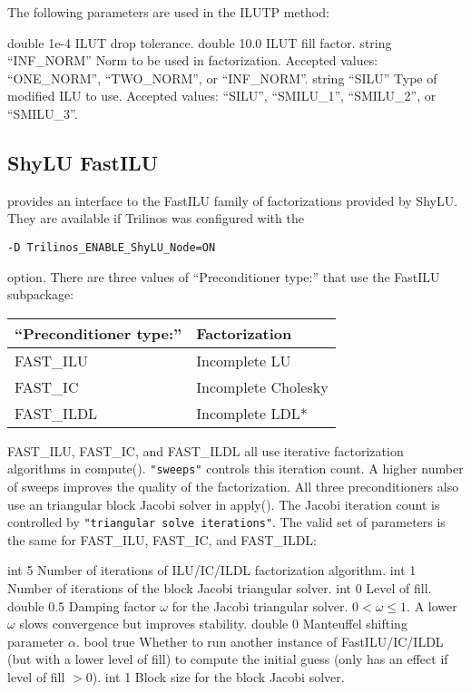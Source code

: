 The following parameters are used in the ILUTP method:

    {double}
    {1e-4}
    {ILUT drop tolerance.}
    {double}
    {10.0}
    {ILUT fill factor.}
    {string}
    {``INF\_NORM''}
    {Norm to be used in factorization. Accepted values: ``ONE\_NORM'', ``TWO\_NORM'', or ``INF\_NORM''.}
    {string}
    {``SILU''}
    {Type of modified ILU to use. Accepted values: ``SILU'', ``SMILU\_1'', ``SMILU\_2'', or ``SMILU\_3''.}

\subsection{ShyLU FastILU}\label{s:FastILU}
\ifpacktwo{} provides an interface to the FastILU family of factorizations provided by ShyLU.
They are available if Trilinos was configured with the

\texttt{-D Trilinos\_ENABLE\_ShyLU\_Node=ON}

option. There are three values of ``Preconditioner type:'' that use the FastILU subpackage:

\begin{table}[h!]
\centering
\begin{tabular}{|l|l|}
\hline
``Preconditioner type:'' & Factorization   \\ \hline \hline
FAST\_ILU                & Incomplete LU       \\ \hline
FAST\_IC                 & Incomplete Cholesky \\ \hline
FAST\_ILDL               & Incomplete LDL*     \\ \hline
\end{tabular}
\end{table}

FAST\_ILU, FAST\_IC, and FAST\_ILDL all use iterative factorization algorithms in compute(). \texttt{"sweeps"} controls
this iteration count. A higher number of sweeps improves the quality of the factorization. All three
preconditioners also use an triangular block Jacobi solver in apply().
The Jacobi iteration count is controlled by \texttt{"triangular solve iterations"}.
The valid set of parameters is the same for FAST\_ILU, FAST\_IC, and FAST\_ILDL:

    {int}
    {5}
    {Number of iterations of ILU/IC/ILDL factorization algorithm.}
    {int}
    {1}
    {Number of iterations of the block Jacobi triangular solver.}
    {int}
    {0}
    {Level of fill.}
    {double}
    {0.5}
    {Damping factor $\omega$ for the Jacobi triangular solver. $0 < \omega \leq 1$. A lower $\omega$ slows convergence but improves stability.}
    {double}
    {0}
    {Manteuffel shifting parameter $\alpha$.}
    {bool}
    {true}
    {Whether to run another instance of FastILU/IC/ILDL (but with a lower level of fill) to compute the initial guess (only has an effect if level of fill $> 0$).} 
    {int}
    {1}
    {Block size for the block Jacobi solver.}

